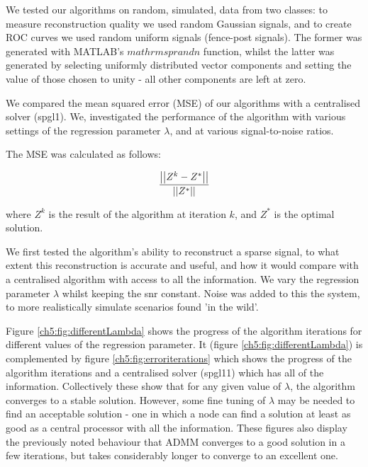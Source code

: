 We tested our algorithms on random, simulated, data from two classes: to measure reconstruction quality we used random Gaussian signals, and to create ROC curves we used random uniform signals (fence-post signals). The former was generated with MATLAB's \(mathrm{sprandn}\) function, whilst the latter was generated by selecting uniformly distributed vector components and setting the value of those chosen to unity - all other components are left at zero.

We compared the mean squared error (MSE) of our algorithms with a centralised solver (spgl1). We, investigated the performance of the algorithm with various settings of the regression parameter \(\lambda\), and at various signal-to-noise ratios. 

The MSE was calculated as follows:

\begin{equation}
\frac{\left|\left|Z^k - Z^*\right|\right|}{\left|\left|Z^*\right|\right|}
\end{equation}

where \(Z^k\) is the result of the algorithm at iteration \(k\), and \(Z^*\) is the optimal solution.

We first tested the algorithm's ability to reconstruct a sparse signal, to what extent this reconstruction is accurate and useful, and how it would compare with a centralised algorithm with access to all the information. We vary the regression parameter \(\lambda\) whilst keeping the \gls{snr} constant. Noise was added to this the system, to more realistically simulate scenarios found 'in the wild'.

Figure \ref{ch5:fig:differentLambda} shows the progress of the algorithm iterations for different values of the regression parameter. It (figure \ref{ch5:fig:differentLambda}) is complemented by figure \ref{ch5:fig:erroriterations} which shows the progress of the algorithm iterations and a centralised solver (spgl11) which has all of the information. Collectively these show that for any given value of \(\lambda\), the algorithm converges to a stable solution. However, some fine tuning of \(\lambda\) may be needed to find an acceptable solution - one in which a node can find a solution at least as good as a central processor with all the information. These figures also display the previously noted \cite{Boyd2010} behaviour that ADMM converges to a good solution in a few iterations, but takes considerably longer to converge to an excellent one.

